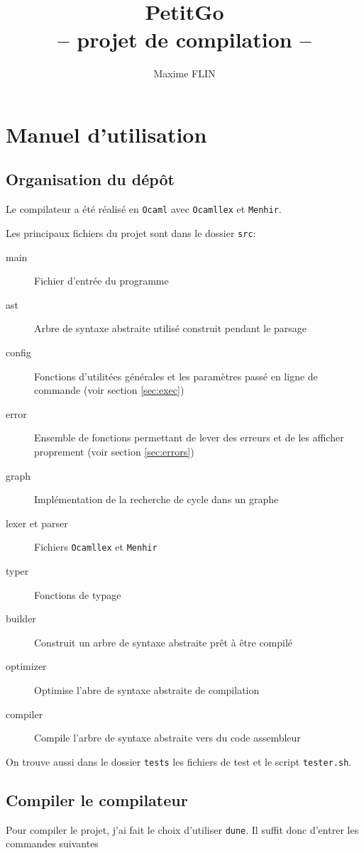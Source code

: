 \documentclass[11pt]{article}
\title{
  PetitGo \\
  \large -- projet de compilation --}
\author{Maxime FLIN}
\begin{document}
\maketitle

\section{Manuel d'utilisation}
\subsection{Organisation du dépôt}
Le compilateur a été réalisé en \texttt{Ocaml} avec \texttt{Ocamllex} et \texttt{Menhir}.

Les principaux fichiers du projet sont dans le dossier \texttt{src}:

\begin{description}
\item[main] Fichier d'entrée du programme
\item[ast] Arbre de syntaxe abstraite utilisé construit pendant le parsage
\item[config] Fonctions d'utilitées générales et les paramètres passé en ligne de commande (voir section \ref{sec:exec})
\item[error] Ensemble de fonctions permettant de lever des erreurs et de les afficher proprement (voir section \ref{sec:errors})
\item[graph] Implémentation de la recherche de cycle dans un graphe
\item[lexer et parser] Fichiers \texttt{Ocamllex} et \texttt{Menhir}
\item[typer] Fonctions de typage
\item[builder] Construit un arbre de syntaxe abstraite prêt à être compilé
\item[optimizer] Optimise l'abre de syntaxe abstraite de compilation
\item[compiler] Compile l'arbre de syntaxe abstraite vers du code assembleur
\end{description}

On trouve aussi dans le dossier \texttt{tests} les fichiers de test et le script \texttt{tester.sh}.

\subsection{Compiler le compilateur}

Pour compiler le projet, j'ai fait le choix d'utiliser \texttt{dune}. Il suffit donc d'entrer les commandes suivantes
\end{document}
